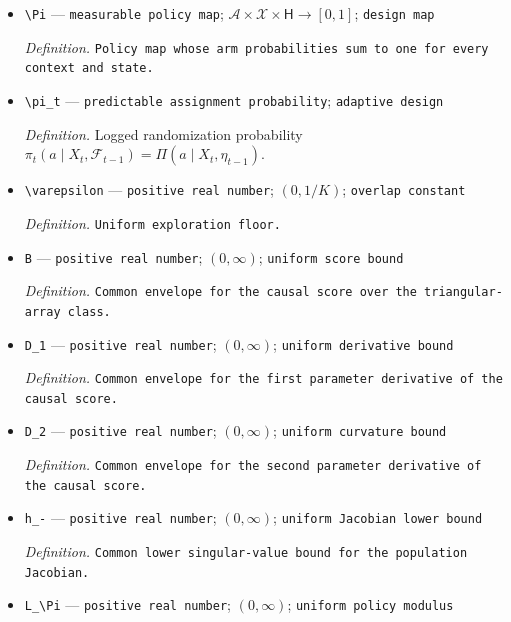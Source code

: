 \documentclass{article}
\begin{document}
\begin{itemize}
  \par\smallskip\noindent\emph{Definition.} \texttt{Policy state before the first adaptive randomization.}
  \item \texttt{\textbackslash{}\allowbreak{}Pi} --- \texttt{measurable policy map}; \(\mathcal A\times\mathcal X\times\mathsf H\to[0,1]\); \texttt{design map}
  \par\smallskip\noindent\emph{Definition.} \texttt{Policy map whose arm probabilities sum to one for every context and state.}
  \item \texttt{\textbackslash{}\allowbreak{}pi\_\allowbreak{}t} --- \texttt{predictable assignment probability}; \texttt{adaptive design}
  \par\smallskip\noindent\emph{Definition.} Logged randomization probability \(\pi_t(a\mid X_t,\mathcal F_{t-1})=\Pi(a\mid X_t,\eta_{t-1})\).
  \item \texttt{\textbackslash{}\allowbreak{}varepsilon} --- \texttt{positive real number}; \((0,1/K)\); \texttt{overlap constant}
  \par\smallskip\noindent\emph{Definition.} \texttt{Uniform exploration floor.}
  \item \texttt{B} --- \texttt{positive real number}; \((0,\infty)\); \texttt{uniform score bound}
  \par\smallskip\noindent\emph{Definition.} \texttt{Common envelope for the causal score over the triangular-\allowbreak{}array class.}
  \item \texttt{D\_\allowbreak{}1} --- \texttt{positive real number}; \((0,\infty)\); \texttt{uniform derivative bound}
  \par\smallskip\noindent\emph{Definition.} \texttt{Common envelope for the first parameter derivative of the causal score.}
  \item \texttt{D\_\allowbreak{}2} --- \texttt{positive real number}; \((0,\infty)\); \texttt{uniform curvature bound}
  \par\smallskip\noindent\emph{Definition.} \texttt{Common envelope for the second parameter derivative of the causal score.}
  \item \texttt{h\_\allowbreak{}-\allowbreak{}} --- \texttt{positive real number}; \((0,\infty)\); \texttt{uniform Jacobian lower bound}
  \par\smallskip\noindent\emph{Definition.} \texttt{Common lower singular-\allowbreak{}value bound for the population Jacobian.}
  \item \texttt{L\_\allowbreak{}\textbackslash{}\allowbreak{}Pi} --- \texttt{positive real number}; \((0,\infty)\); \texttt{uniform policy modulus}

\end{itemize}
\end{document}
